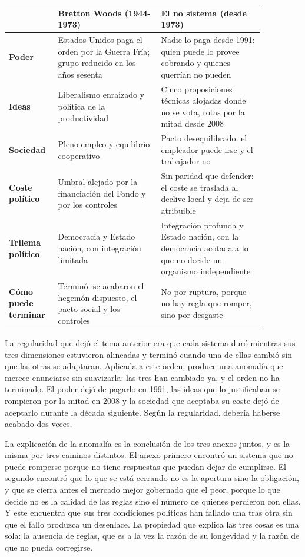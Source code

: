 \documentclass[10pt,a4paper]{article}
\newcounter{anexo}
\begin{document}
\begin{center}
{\footnotesize
\begin{tabular}{|p{0.14\linewidth}|p{0.36\linewidth}|p{0.36\linewidth}|}
\hline
 & \textbf{Bretton Woods (1944-1973)} & \textbf{El no sistema (desde 1973)} \\
\hline
\textbf{Poder} & Estados Unidos paga el orden por la Guerra Fría; grupo reducido en los años sesenta & Nadie lo paga desde 1991: quien puede lo provee cobrando y quienes querrían no pueden \\
\hline
\textbf{Ideas} & Liberalismo enraizado y política de la productividad & Cinco proposiciones técnicas alojadas donde no se vota, rotas por la mitad desde 2008 \\
\hline
\textbf{Sociedad} & Pleno empleo y equilibrio cooperativo & Pacto desequilibrado: el empleador puede irse y el trabajador no \\
\hline
\textbf{Coste político} & Umbral alejado por la financiación del Fondo y por los controles & Sin paridad que defender: el coste se traslada al declive local y deja de ser atribuible \\
\hline
\textbf{Trilema político} & Democracia y Estado nación, con integración limitada & Integración profunda y Estado nación, con la democracia acotada a lo que no decide un organismo independiente \\
\hline
\textbf{Cómo puede terminar} & Terminó: se acabaron el hegemón dispuesto, el pacto social y los controles & No por ruptura, porque no hay regla que romper, sino por desgaste \\
\hline
\end{tabular}}
\end{center}

La regularidad que dejó el tema anterior era que cada sistema duró mientras sus tres dimensiones estuvieron alineadas y terminó cuando una de ellas cambió sin que las otras se adaptaran. Aplicada a este orden, produce una anomalía que merece enunciarse sin suavizarla: las tres han cambiado ya, y el orden no ha terminado. El poder dejó de pagarlo en 1991, las ideas que lo justificaban se rompieron por la mitad en 2008 y la sociedad que aceptaba su coste dejó de aceptarlo durante la década siguiente. Según la regularidad, debería haberse acabado dos veces.

La explicación de la anomalía es la conclusión de los tres anexos juntos, y es la misma por tres caminos distintos. El anexo primero encontró un sistema que no puede romperse porque no tiene respuestas que puedan dejar de cumplirse. El segundo encontró que lo que se está cerrando no es la apertura sino la obligación, y que se cierra antes el mercado mejor gobernado que el peor, porque lo que decide no es la calidad de las reglas sino el número de quienes perdieron con ellas. Y este encuentra que sus tres condiciones políticas han fallado una tras otra sin que el fallo produzca un desenlace. La propiedad que explica las tres cosas es una sola: la ausencia de reglas, que es a la vez la razón de su longevidad y la razón de que no pueda corregirse.
\end{document}
